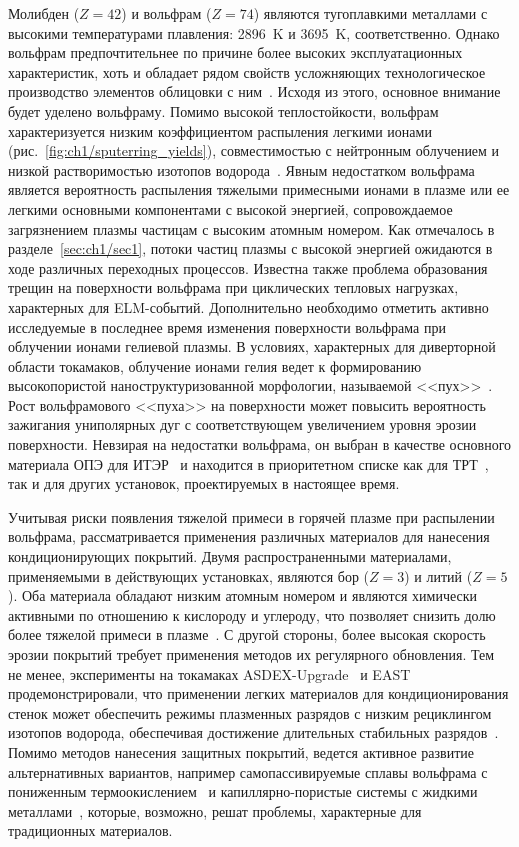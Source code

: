 Молибден ($Z=42$) и вольфрам ($Z=74$) являются тугоплавкими металлами с высокими температурами плавления: \SI{2896}{\kelvin} и \SI{3695}{\kelvin}, соответственно. Однако вольфрам предпочтительнее по причине более высоких эксплуатационных характеристик, хоть и обладает рядом свойств усложняющих технологическое производство элементов облицовки с ним~\cite{Piskarev2024}. Исходя из этого, основное внимание будет уделено вольфраму. Помимо высокой теплостойкости, вольфрам характеризуется низким коэффициентом распыления легкими ионами (рис.~\cref{fig:ch1/sputerring_yields}), совместимостью с нейтронным облучением и низкой растворимостью изотопов водорода~\cite{Roth2011, Pintsuk2012,Rieth2019}. Явным недостатком вольфрама является вероятность распыления тяжелыми примесными ионами в плазме или ее легкими основными компонентами с высокой энергией, сопровождаемое загрязнением плазмы частицам с высоким атомным номером. Как отмечалось в разделе~\cref{sec:ch1/sec1}, потоки частиц плазмы с высокой энергией ожидаются в ходе различных переходных процессов. Известна также проблема образования трещин на поверхности вольфрама при циклических тепловых нагрузках, характерных для ELM-событий. Дополнительно необходимо отметить активно исследуемые в последнее время изменения поверхности вольфрама при облучении ионами гелиевой плазмы. В условиях, характерных для диверторной области токамаков, облучение ионами гелия ведет к формированию высокопористой наноструктуризованной морфологии, называемой <<пух>>~\cite{Ueda2018,Kajita2018,Fedorovich2019,hammond2017helium,Kajita2020,Wright2022}. Рост вольфрамового <<пуха>> на поверхности может повысить вероятность зажигания униполярных дуг с соответствующем увеличением уровня эрозии поверхности. Невзирая на недостатки вольфрама, он выбран в качестве основного материала ОПЭ для ИТЭР~\cite{Pitts2025} и находится в приоритетном списке как для ТРТ~\cite{Piskarev2024}, так и для других установок, проектируемых в настоящее время.

Учитывая риски появления тяжелой примеси в горячей плазме при распылении вольфрама, рассматривается применения различных материалов для нанесения кондиционирующих покрытий. Двумя распространенными материалами, применяемыми в действующих установках, являются бор ($Z=3$) и литий ($Z=5$). Оба материала обладают низким атомным номером и являются химически активными по отношению к кислороду и углероду, что позволяет снизить долю более тяжелой примеси в плазме~\cite{Winter1996,Wauters2020}. С другой стороны, более высокая скорость эрозии покрытий требует применения методов их регулярного обновления. Тем не менее, эксперименты на токамаках ASDEX-Upgrade~\cite{Krieger2023} и EAST~\cite{Yu2023} продемонстрировали, что применении легких материалов для кондиционирования стенок может обеспечить режимы плазменных разрядов с низким рециклингом изотопов водорода, обеспечивая достижение длительных стабильных разрядов~\cite{Zakharov2019}. Помимо методов нанесения защитных покрытий, ведется активное развитие альтернативных вариантов, например самопассивируемые сплавы вольфрама с пониженным термоокислением~\cite{Litnovsky2020} и капиллярно-пористые системы с жидкими металлами~\cite{Lublinskii2015}, которые, возможно, решат проблемы, характерные для традиционных материалов.

